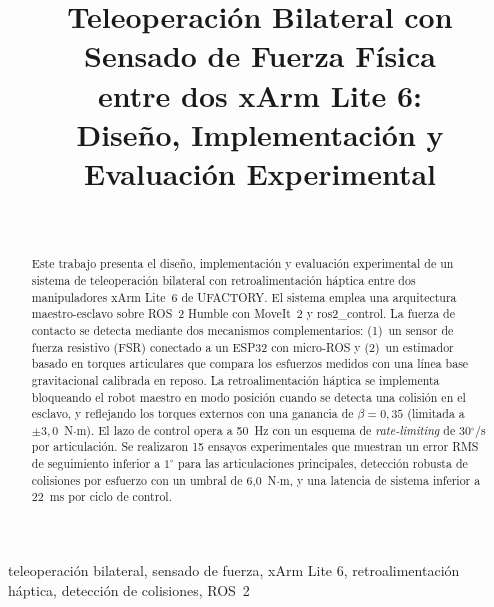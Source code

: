 \documentclass[journal,10pt,twoside]{IEEEtran}
\begin{document}
\title{Teleoperación Bilateral con Sensado de Fuerza Física\\
  entre dos xArm Lite 6:\\
  Diseño, Implementación y Evaluación Experimental}

\author{%
  \\
}

\maketitle

\begin{abstract}
Este trabajo presenta el diseño, implementación y evaluación experimental
de un sistema de teleoperación bilateral con retroalimentación háptica
entre dos manipuladores xArm Lite~6 de UFACTORY. El sistema emplea una
arquitectura maestro-esclavo sobre ROS~2 Humble con MoveIt~2 y
ros2\_control. La fuerza de contacto se detecta mediante dos mecanismos
complementarios: (1)~un sensor de fuerza resistivo (FSR) conectado a un
ESP32 con micro-ROS y (2)~un estimador basado en torques articulares que
compara los esfuerzos medidos con una línea base gravitacional calibrada
en reposo. La retroalimentación háptica se implementa bloqueando el
robot maestro en modo posición cuando se detecta una colisión en el
esclavo, y reflejando los torques externos con una ganancia de
$\beta=0{,}35$ (limitada a $\pm 3{,}0$~N$\cdot$m). El lazo de control
opera a 50~Hz con un esquema de \emph{rate-limiting} de 30$^\circ$/s por
articulación. Se realizaron 15 ensayos experimentales que muestran un
error RMS de seguimiento inferior a $1^\circ$ para las articulaciones
principales, detección robusta de colisiones por esfuerzo con un umbral
de 6{,}0~N$\cdot$m, y una latencia de sistema inferior a 22~ms por ciclo
de control.
\end{abstract}

\begin{IEEEkeywords}
  teleoperación bilateral, sensado de fuerza, xArm Lite 6,
  retroalimentación háptica, detección de colisiones, ROS~2
\end{IEEEkeywords}
\end{document}
